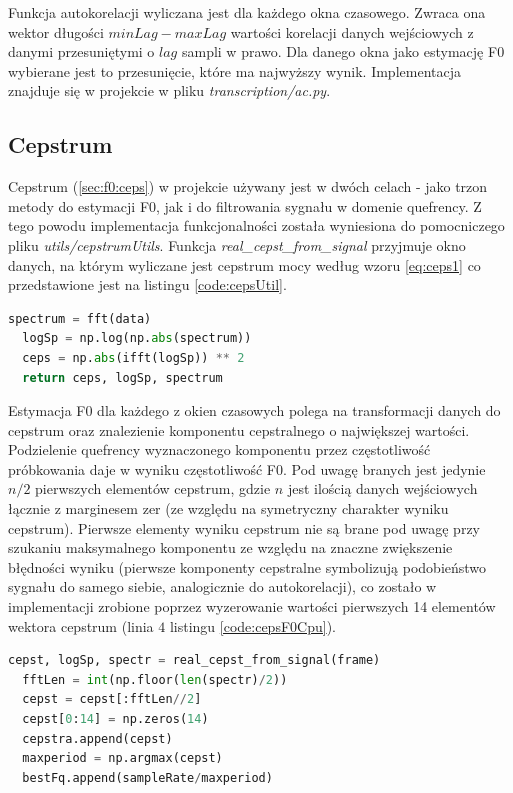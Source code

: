 \documentclass[12pt,a4paper,twoside]{mwart}
\begin{document}
Funkcja autokorelacji wyliczana jest dla każdego okna czasowego. Zwraca ona wektor długości $minLag - maxLag$ wartości korelacji danych wejściowych z danymi przesuniętymi o $lag$ sampli w prawo. Dla danego okna jako estymację F0 wybierane jest to przesunięcie, które ma najwyższy wynik. Implementacja znajduje się w projekcie w pliku \textit{transcription/ac.py}.


\subsection{Cepstrum}\label{sec:impl:alg:ceps}
Cepstrum (\ref{sec:f0:ceps}) w projekcie używany jest w dwóch celach - jako trzon metody do estymacji F0, jak i do filtrowania sygnału w domenie quefrency. Z tego powodu implementacja funkcjonalności została wyniesiona do pomocniczego pliku \textit{utils/cepstrumUtils}. Funkcja \textit{real\_cepst\_from\_signal} przyjmuje okno danych, na którym wyliczane jest cepstrum mocy według wzoru \ref{eq:ceps1} co przedstawione jest na listingu \ref{code:cepsUtil}.

\begin{lstlisting}[language=Python, caption={Wyliczanie cepstrum mocy}, captionpos=b, label={code:cepsUtil}]
  spectrum = fft(data)
  logSp = np.log(np.abs(spectrum))
  ceps = np.abs(ifft(logSp)) ** 2
  return ceps, logSp, spectrum
\end{lstlisting}

Estymacja F0 dla każdego z okien czasowych polega na transformacji danych do cepstrum oraz znalezienie komponentu cepstralnego o największej wartości. Podzielenie quefrency wyznaczonego komponentu przez częstotliwość próbkowania daje w wyniku częstotliwość F0. Pod uwagę branych jest jedynie $n / 2$ pierwszych elementów cepstrum, gdzie $n$ jest ilością danych wejściowych łącznie z marginesem zer (ze względu na symetryczny charakter wyniku cepstrum). Pierwsze elementy wyniku cepstrum nie są brane pod uwagę przy szukaniu maksymalnego komponentu ze względu na znaczne zwiększenie błędności wyniku (pierwsze komponenty cepstralne symbolizują podobieństwo sygnału do samego siebie, analogicznie do autokorelacji), co zostało w implementacji zrobione poprzez wyzerowanie wartości pierwszych 14 elementów wektora cepstrum (linia $4$ listingu \ref{code:cepsF0Cpu}). 

\begin{lstlisting}[language=Python, caption={Estymacja F0 przy pomocy cepstrum}, captionpos=b, label={code:cepsF0Cpu}]
  cepst, logSp, spectr = real_cepst_from_signal(frame)
  fftLen = int(np.floor(len(spectr)/2))
  cepst = cepst[:fftLen//2]
  cepst[0:14] = np.zeros(14)
  cepstra.append(cepst)
  maxperiod = np.argmax(cepst)
  bestFq.append(sampleRate/maxperiod)
\end{lstlisting}
\end{document}
